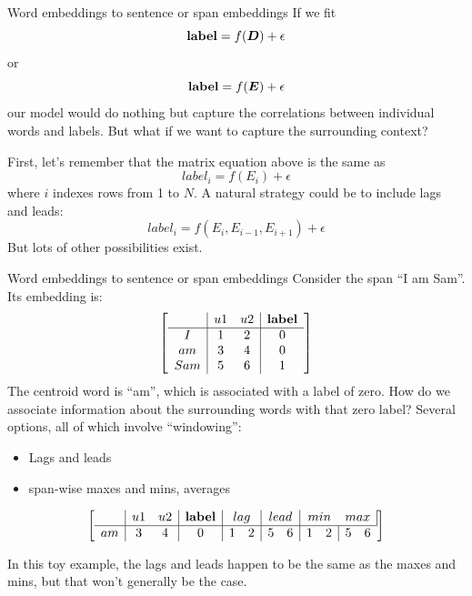 \documentclass[10pt]{beamer}
\begin{document}
\begin{frame}{Word embeddings to sentence or span embeddings}
If we fit 
\[
\text{\textbf{label}} = f(\bm{D}) + \epsilon
\]
or 
\[
\text{\textbf{label}} = f(\bm{E}) + \epsilon
\]
our model would do nothing but capture the correlations between individual words and labels.  But what if we want to capture the surrounding context?

First, let's remember that the matrix equation above is the same as 
\[
label_i = f(E_i) + \epsilon
\]
where $i$ indexes rows from 1 to $N$.  A natural strategy could be to include lags and leads:
\[
label_i = f(E_i, E_{i-1}, E_{i+1}) + \epsilon
\]
But lots of other possibilities exist.
\end{frame}


\begin{frame}{Word embeddings to sentence or span embeddings}
Consider the span ``I am Sam''.  Its embedding is:
\[\left[\begin{array}{c|cc|c}
     & u1 & u2 & \text{\textbf{label}}\\
     \hline
I    & 1 & 2 & 0\\
am   & 3 & 4 & 0 \\
Sam  & 5 & 6 & 1  \\
\end{array}\right]\]
The centroid word is ``am'', which is associated with a label of zero.  How do we associate information about the surrounding words with that zero label?  Several options, all of which involve ``windowing'':
\begin{itemize}
\item Lags and leads
\item span-wise maxes and mins, averages
\end{itemize}
\[\left[\begin{array}{c|cc|c|cc|cc|cc|cc}
     & u1 & u2 & \text{\textbf{label}} & \multicolumn{2}{c|}{lag}& \multicolumn{2}{c|}{lead} & \multicolumn{2}{c}{min}& \multicolumn{2}{c|}{max}\\
     \hline
am   & 3 & 4 & 0 &1 &2 & 5 & 6 &1 &2 & 5 & 6\\
\end{array}\right]\]

In this toy example, the lags and leads happen to be the same as the maxes and mins, but that won't generally be the case.
\end{frame}
\end{document}
